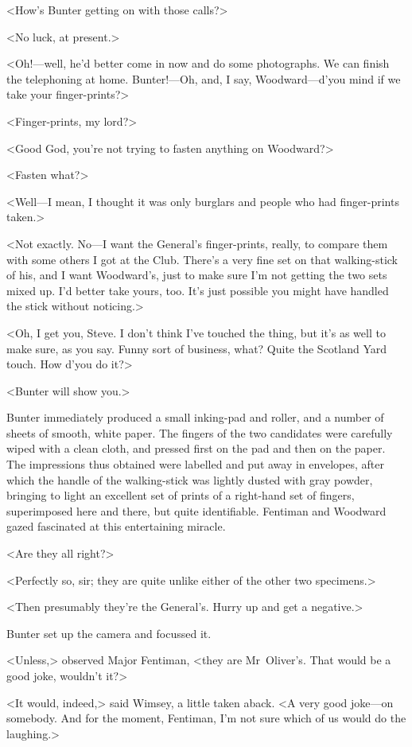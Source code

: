 <How's Bunter getting on with those calls?>

<No luck, at present.>

<Oh!—well, he'd better come in now and do some photographs. We can finish the telephoning at home. Bunter!—Oh, and, I say, Woodward—d'you mind if we take your finger-prints?>

<Finger-prints, my lord?>

<Good God, you're not trying to fasten anything on Woodward?>

<Fasten what?>

<Well—I mean, I thought it was only burglars and people who had finger-prints taken.>

<Not exactly. No—I want the General's finger-prints, really, to compare them with some others I got at the Club. There's a very fine set on that walking-stick of his, and I want Woodward's, just to make sure I'm not getting the two sets mixed up. I'd better take yours, too. It's just possible you might have handled the stick without noticing.>

<Oh, I get you, Steve. I don't think I've touched the thing, but it's as well to make sure, as you say. Funny sort of business, what? Quite the Scotland Yard touch. How d'you do it?>

<Bunter will show you.>

Bunter immediately produced a small inking-pad and roller, and a number of sheets of smooth, white paper. The fingers of the two candidates were carefully wiped with a clean cloth, and pressed first on the pad and then on the paper. The impressions thus obtained were labelled and put away in envelopes, after which the handle of the walking-stick was lightly dusted with gray powder, bringing to light an excellent set of prints of a right-hand set of fingers, superimposed here and there, but quite identifiable. Fentiman and Woodward gazed fascinated at this entertaining miracle.

<Are they all right?>

<Perfectly so, sir; they are quite unlike either of the other two specimens.>

<Then presumably they're the General's. Hurry up and get a negative.>

Bunter set up the camera and focussed it.

<Unless,> observed Major Fentiman, <they are Mr~Oliver's. That would be a good joke, wouldn't it?>

<It would, indeed,> said Wimsey, a little taken aback. <A very good joke—on somebody. And for the moment, Fentiman, I'm not sure which of us would do the laughing.>

